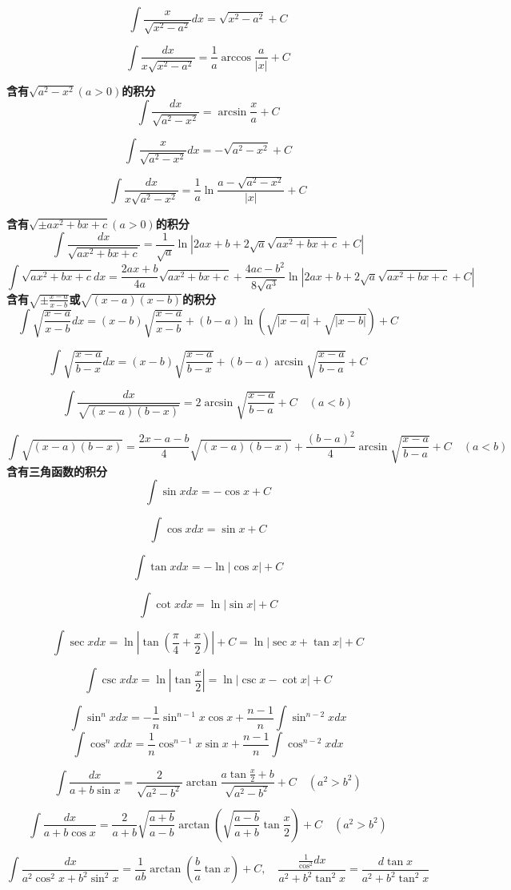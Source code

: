 \documentclass{article}
\begin{document}
$$
\int \frac{x}{\sqrt{x^2-a^2}}dx=\sqrt{x^2-a^2}+C
$$

$$
\int \frac{dx}{x\sqrt{x^2-a^2}}=\frac{1}{a}\arccos \frac{a}{|x|}+C
$$

\textbf{含有$\sqrt{a^2-x^2}(a>0)$的积分}
$$
\int \frac{dx}{\sqrt{a^2-x^2}}=\arcsin \frac{x}{a}+C
$$

$$
\int \frac{x}{\sqrt{a^2-x^2}}dx=-\sqrt{a^2 - x^2}+C
$$

$$
\int \frac{dx}{x\sqrt{a^2-x^2}}=\frac{1}{a}\ln \frac{a-\sqrt{a^2 - x^2}}{|x|}+C
$$

\textbf{含有$\sqrt{\pm ax^2+bx+c}(a>0)$的积分}
$$
\int \frac{dx}{\sqrt{ax^2+bx+c}}=\frac{1}{\sqrt{a}}
\ln|2ax+b+2\sqrt{a}\sqrt{ax^2+bx+c}+C|
$$
$$
\int \sqrt{ax^2+bx+c}dx=\frac{2ax+b}{4a}\sqrt{ax^2+bx+c}+
\frac{4ac-b^2}{8\sqrt{a^3}}
\ln|2ax+b+2\sqrt{a}\sqrt{ax^2+bx+c}+C|
$$
\textbf{含有$\sqrt{\pm \frac{x-a}{x-b}}$或$\sqrt{(x-a)(x-b)}$的积分}
$$
\int \sqrt{\frac{x-a}{x-b}}dx=(x-b)\sqrt{\frac{x-a}{x-b}}+
(b-a)\ln (\sqrt{|x-a|}+\sqrt{|x-b|})+C
$$

$$
\int \sqrt{\frac{x-a}{b-x}}dx=(x-b)\sqrt{\frac{x-a}{b-x}}+
(b-a)\arcsin \sqrt{\frac{x-a}{b-a}}+C
$$

$$
\int \frac{dx}{\sqrt{(x-a)(b-x)}}=2\arcsin \sqrt{\frac{x-a}{b-a}}+C \quad(a<b)
$$

$$
\int \sqrt{(x-a)(b-x)}=\frac{2x-a-b}{4}\sqrt{(x-a)(b-x)}
+ \frac{(b-a)^2}{4}\arcsin \sqrt{\frac{x-a}{b-a}}+C \quad(a<b)
$$
\textbf{含有三角函数的积分}
$$
\int \sin xdx=-\cos x +C
$$

$$
\int \cos xdx =\sin x +C
$$

$$
\int \tan xdx=-\ln|\cos x|+C
$$

$$
\int \cot xdx=\ln|\sin x|+C
$$

$$
\int \sec xdx=\ln|\tan(\frac{\pi}{4}+\frac{x}{2})|+C=\ln|\sec x+ \tan x|+C
$$

$$
\int \csc xdx=\ln|\tan \frac{x}{2}|=\ln|\csc x-\cot x|+C
$$


$$
\int \sin^n x dx=-\frac{1}{n}\sin^{n-1}x \cos x + \frac{n-1}{n}\int \sin^{n-2}x dx
$$
$$
\int \cos^n x dx=\frac{1}{n}\cos^{n-1}x \sin x + \frac{n-1}{n}\int \cos^{n-2}x dx
$$


$$
\int \frac{dx}{a+b\sin x}=\frac{2}{\sqrt{a^2-b^2}}\arctan \frac{a \tan \frac{x}{2}+b}{\sqrt{a^2-b^2}}+C \quad(a^2>b^2)
$$

$$
\int \frac{dx}{a+b\cos x}=\frac{2}{a+b} \sqrt{\frac{a+b}{a-b}}\arctan(\sqrt{\frac{a-b}{a+b}}\tan \frac{x}{2})+C \quad (a^2>b^2)
$$


$$
\int \frac{ dx}{a^2 \cos^2 x+b^2\sin^2 x}=\frac{ 1}{ab} \arctan(\frac{b}{a}\tan x)+C, \quad
\frac{\frac{1}{\cos^2}dx}{a^2+b^2\tan^2 x}=\frac{d \tan x}{a^2 + b^2 \tan^2 x}
$$
\end{document}

